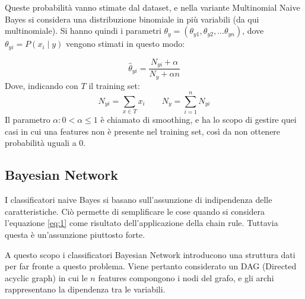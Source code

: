 \documentclass[oneside]{book}
\begin{document}
Queste probabilità vanno stimate dal dataset, e nella variante Multinomial Naive Bayes si considera una distribuzione binomiale in più variabili (da qui multinomiale). Si hanno quindi i parametri $\theta_y = (\theta_{y1}, \theta_{y2}, ...\theta_{yn})$, dove $\theta_{yi} = P(x_i \mid y)$ vengono stimati in questo modo:

$$\hat{\theta}_{yi} = \frac{N_{yi} + \alpha }{N_{y} + \alpha n}$$
Dove, indicando con $T$ il training set:
$$N_{yi} = \sum_{x \in T}x_i \qquad
N_{y} = \sum_{i=1}^{n}N_{yi}$$
Il parametro $\alpha: 0 < \alpha \leq 1$ è chiamato di smoothing, e ha lo scopo di gestire quei casi in cui una features non è presente nel training set, così da non ottenere probabilità uguali a $0$.

\newpage
\subsection{Bayesian Network}
I classificatori naive Bayes si basano sull'assunzione di indipendenza delle caratteristiche. Ciò permette di semplificare le cose quando si considera l'equazione \eqref{eq:1} come risultato dell'applicazione della chain rule.
Tuttavia questa è un'assunzione piuttosto forte.

A questo scopo i classificatori Bayesian Network introducono una struttura dati per far fronte a questo problema. Viene pertanto considerato un DAG (Directed acyclic graph) in cui le $n$ features compongono i nodi del grafo, e gli archi rappresentano la dipendenza tra le variabili.
\end{document}

